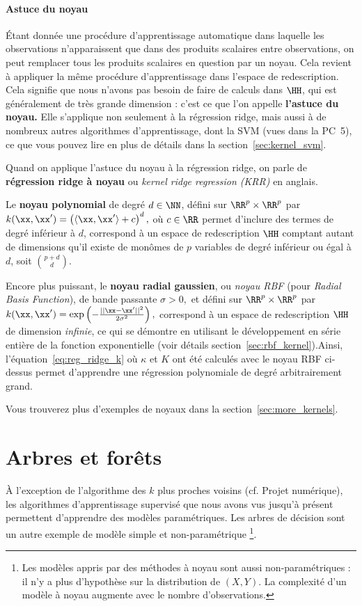 \paragraph{Astuce du noyau} Étant donnée une procédure d'apprentissage
automatique dans laquelle les observations n'apparaissent que dans des produits
scalaires entre observations, on peut remplacer tous les produits scalaires en
question par un noyau. Cela revient à appliquer la même procédure
d'apprentissage dans l'espace de redescription.\\
Cela signifie que nous n'avons pas besoin de faire de calculs dans $\HH$, qui
est généralement de très grande dimension : c'est ce que l'on appelle
\textbf{l'astuce du noyau.} Elle s'applique non seulement à la régression
ridge, mais aussi à de nombreux autres algorithmes d'apprentissage, dont la SVM
(vues dans la PC~5), ce que vous pouvez lire en plus de détails dans la
section~\ref{sec:kernel_svm}.

Quand on applique l'astuce du noyau à la régression ridge, on parle de
\textbf{régression ridge à noyau} ou \textit{kernel ridge regression (KRR)} en
anglais.


Le \textbf{noyau polynomial} de degré $d \in \NN$,
défini sur $\RR^p \times \RR^p$ par
$k(\xx, \xx^\prime) = \left( \langle \xx, \xx^\prime \rangle + c\right)^d,$ où $c \in \RR$
permet d'inclure des termes de degré inférieur à $d$, correspond à un espace de
redescription $\HH$ comptant autant de dimensions qu'il existe de monômes de
$p$ variables de degré inférieur ou égal à $d$, soit $p+d \choose d$.

Encore plus puissant, le \textbf{noyau radial gaussien}, ou {\it noyau RBF}
(pour {\it Radial Basis Function}), de bande passante $\sigma > 0,$ et défini
sur $\RR^p \times \RR^p$ par
$k(\xx, \xx^\prime) = \exp\left( - \frac{||\xx - \xx^\prime||^2}{2 \sigma^2}
\right),$ correspond à un espace de redescription $\HH$ de dimension {\it
  infinie}, ce qui se démontre en utilisant le développement en série entière
de la fonction exponentielle (voir détails section~\ref{sec:rbf_kernel}).Ainsi,
l'équation~\eqref{eq:reg_ridge_k} où $\kappa$ et $K$ ont été calculés avec le
noyau RBF ci-dessus permet d'apprendre une régression polynomiale de degré
arbitrairement grand.

Vous trouverez plus d'exemples de noyaux dans la section~\ref{sec:more_kernels}.


\section{Arbres et forêts}
À l'exception de l'algorithme des $k$ plus proches voisins (cf. Projet numérique), les
algorithmes d'apprentissage supervisé que nous avons vus jusqu'à présent
permettent d'apprendre des modèles paramétriques. Les arbres de décision sont
un autre exemple de modèle simple et non-paramétrique \footnote{Les modèles
  appris par des méthodes à noyau sont aussi non-paramétriques : il n'y a plus
  d'hypothèse sur la distribution de $(X, Y)$. La complexité d'un modèle à
  noyau augmente avec le nombre d'observations.}.

